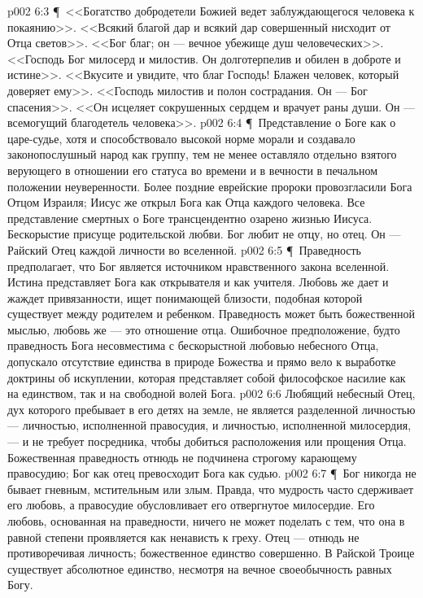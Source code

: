 \vs p002 6:3 \P\ <<Богатство добродетели Божией ведет заблуждающегося человека к покаянию>>. <<Всякий благой дар и всякий дар совершенный нисходит от Отца светов>>. <<Бог благ; он --- вечное убежище душ человеческих>>. <<Господь Бог милосерд и милостив. Он долготерпелив и обилен в доброте и истине>>. <<Вкусите и увидите, что благ Господь! Блажен человек, который доверяет ему>>. <<Господь милостив и полон сострадания. Он --- Бог спасения>>. <<Он исцеляет сокрушенных сердцем и врачует раны души. Он --- всемогущий благодетель человека>>.
\vs p002 6:4 \P\ Представление о Боге как о царе\hyp{}судье, хотя и способствовало высокой норме морали и создавало законопослушный народ как группу, тем не менее оставляло отдельно взятого верующего в отношении его статуса во времени и в вечности в печальном положении неуверенности. Более поздние еврейские пророки провозгласили Бога Отцом Израиля; Иисус же открыл Бога как Отца каждого человека. Все представление смертных о Боге трансцендентно озарено жизнью Иисуса. Бескорыстие присуще родительской любви. Бог любит не  отцу, но  отец. Он --- Райский Отец каждой личности во вселенной.
\vs p002 6:5 \P\ Праведность предполагает, что Бог является источником нравственного закона вселенной. Истина представляет Бога как открывателя и как учителя. Любовь же дает и жаждет привязанности, ищет понимающей близости, подобная которой существует между родителем и ребенком. Праведность может быть божественной мыслью, любовь же --- это отношение отца. Ошибочное предположение, будто праведность Бога несовместима с бескорыстной любовью небесного Отца, допускало отсутствие единства в природе Божества и прямо вело к выработке доктрины об искуплении, которая представляет собой философское насилие как на единством, так и на свободной волей Бога.
\vs p002 6:6 Любящий небесный Отец, дух которого пребывает в его детях на земле, не является разделенной личностью --- личностью, исполненной правосудия, и личностью, исполненной милосердия, --- и не требует посредника, чтобы добиться расположения или прощения Отца. Божественная праведность отнюдь не подчинена строгому карающему правосудию; Бог как отец превосходит Бога как судью.
\vs p002 6:7 \P\ Бог никогда не бывает гневным, мстительным или злым. Правда, что мудрость часто сдерживает его любовь, а правосудие обусловливает его отвергнутое милосердие. Его любовь, основанная на праведности, ничего не может поделать с тем, что она в равной степени проявляется как ненависть к греху. Отец --- отнюдь не противоречивая личность; божественное единство совершенно. В Райской Троице существует абсолютное единство, несмотря на вечное своеобычность равных Богу.
